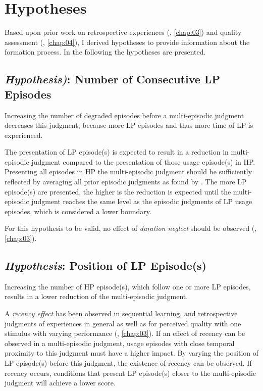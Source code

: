 \section{Hypotheses}
Based upon prior work on retrospective experiences (\cf, \autoref{chap:03}) and quality assessment (\cf, \autoref{chap:04}), I derived \unit[6]{hypotheses} to provide information about the formation process.
In the following the \unit[6]{hypotheses} are presented.

\subsection{\emph{Hypothesis)}: Number of Consecutive \acl{LP} Episodes}
\begin{hypothesis}\label{hypo:number}
Increasing the number of degraded episodes before a multi-episodic judgment decreases this judgment, because more \ac{LP} episodes and thus more time of \ac{LP} is experienced.
\end{hypothesis}

The presentation of \ac{LP} episode(s) is expected to result in a reduction in multi-episodic judgment compared to the presentation of those usage episode(s) in \ac{HP}.
Presenting all episodes in \ac{HP} the multi-episodic judgment should be sufficiently reflected by averaging all prior episodic judgments as found by \cite{moller_single-call_2011}.
The more \ac{LP} episode(s) are presented, the higher is the reduction is expected until the multi-episodic judgment reaches the same level as the episodic judgments of \ac{LP} usage episodes, which is considered a lower boundary.

For this hypothesis to be valid, no effect of \emph{duration neglect} should be observed (\cf, \autoref{chap:03}).

\subsection{\emph{Hypothesis}: Position of \acl{LP} Episode(s)}
\begin{hypothesis}\label{hypo:position}
Increasing the number of \ac{HP} episode(s), which follow one or more \ac{LP} episodes, results in a lower reduction of the multi-episodic judgment.
\end{hypothesis}

A \emph{recency effect} has been observed in sequential learning, and retrospective judgments of experiences in general as well as for perceived quality with one stimulus with varying performance (\cf, \autoref{chap:03}).
If an effect of recency can be observed in a multi-episodic judgment, usage episodes with close temporal proximity to this judgment must have a higher impact.
By varying the position of \ac{LP} episode(s) before this judgment, the existence of recency can be observed.
If recency occurs, conditions that present \ac{LP} episode(s) closer to the multi-episodic judgment will achieve a lower score.

